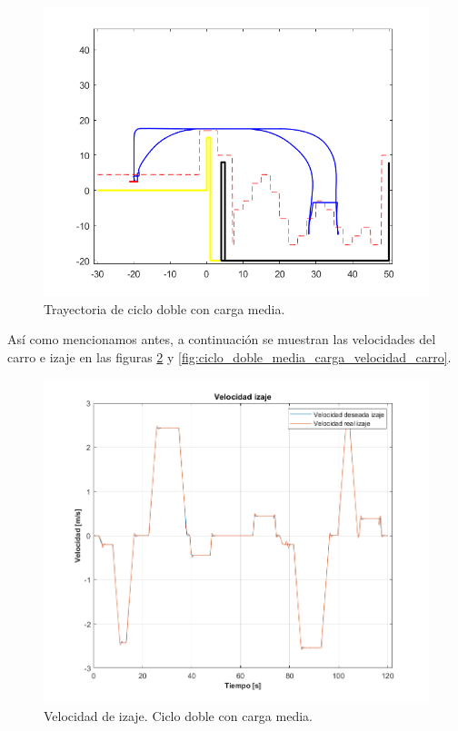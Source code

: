 \documentclass[11pt]{article}
\begin{document}
\begin{figure}[!h]
	\centering
	\includegraphics[width=1\textwidth]{images/ciclo_doble_carga_media/trayectoria_completa_xl.png}
	\caption{Trayectoria de ciclo doble con carga media.}
	\label{fig:ciclo_doble_media_carga_trayectoria}
\end{figure}

Así como mencionamos antes, a continuación se muestran las velocidades del carro e izaje en las figuras \ref{fig:ciclo_doble_media_carga_velocidad_izaje} y \ref{fig:ciclo_doble_media_carga_velocidad_carro}.

\begin{figure}%
	\centering
	\includegraphics[width=1\textwidth]{images/ciclo_doble_carga_media/velocidad_izaje.png}
	\caption{Velocidad de izaje. Ciclo doble con carga media.}
	\label{fig:ciclo_doble_media_carga_velocidad_izaje}
\end{figure}
\end{document}
